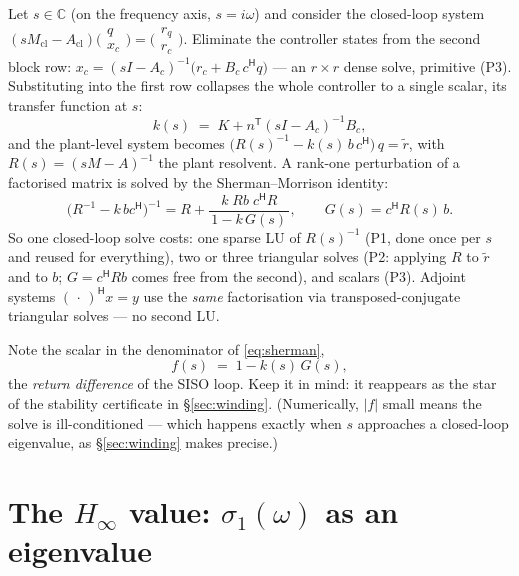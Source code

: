 \documentclass[11pt,a4paper]{article}
\newcommand{\C}{\mathbb{C}}
\newcommand{\Mcl}{M_{\mathrm{cl}}}
\newcommand{\Acl}{A_{\mathrm{cl}}}
\newcommand{\hp}{^{\mathsf H}}
\newcommand{\tp}{^{\mathsf T}}   %
\begin{document}
{Let $s\in\C$ (on the frequency axis, $s=i\omega$) and consider the closed-loop system
$(s\Mcl-\Acl)\bigl(\begin{smallmatrix}q\\x_c\end{smallmatrix}\bigr)
=\bigl(\begin{smallmatrix}r_q\\r_c\end{smallmatrix}\bigr)$.
Eliminate the controller states from the second block row:
$x_c=(sI-A_c)^{-1}\bigl(r_c+B_c\,c\hp q\bigr)$ --- an $r\times r$ dense solve, primitive
(P3).  Substituting into the first row collapses the whole controller to a single scalar,
its transfer function at $s$:
\begin{equation}
\boxed{\;k(s)\;=\;K + n\tp (sI-A_c)^{-1}B_c,\;}
\label{eq:ks}
\end{equation}
and the plant-level system becomes
$\bigl(R(s)^{-1} - k(s)\,b\,c\hp\bigr)\,q = \tilde r$, with $R(s)=(sM-A)^{-1}$ the plant
resolvent.  A rank-one perturbation of a factorised matrix is solved by the
Sherman--Morrison identity:
\begin{equation}
\boxed{\;
\bigl(R^{-1} - k\,bc\hp\bigr)^{-1}
= R + \frac{k\; Rb\; c\hp R}{\,1-k\,G(s)\,},
\qquad G(s) = c\hp R(s)\, b .
\;}
\label{eq:sherman}
\end{equation}
So one closed-loop solve costs: one sparse LU of $R(s)^{-1}$ (P1, done once per $s$ and
reused for everything), two or three triangular solves (P2: applying $R$ to $\tilde r$
and to $b$; $G=c\hp Rb$ comes free from the second), and scalars (P3).  Adjoint systems
$(\,\cdot\,)\hp x = y$ use the \emph{same} factorisation via transposed-conjugate
triangular solves --- no second LU.

Note the scalar in the denominator of \eqref{eq:sherman},
\[
f(s) \;=\; 1 - k(s)\,G(s),
\]
the \emph{return difference} of the SISO loop.  Keep it in mind: it reappears as the star
of the stability certificate in \S\ref{sec:winding}.  (Numerically, $|f|$ small means the
solve is ill-conditioned --- which happens exactly when $s$ approaches a closed-loop
eigenvalue, as \S\ref{sec:winding} makes precise.)

\section{The $H_\infty$ value: $\sigma_1(\omega)$ as an eigenvalue}
\label{sec:sigma}

}
\end{document}

